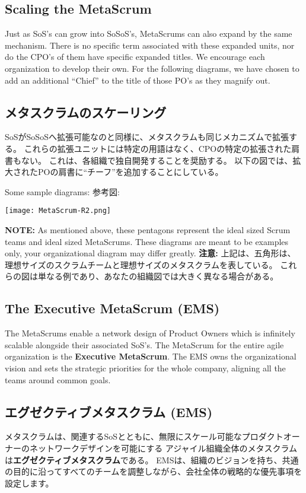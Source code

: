 \documentclass[12pt,a4paper,parskip=full]{scrartcl}
\begin{document}
\subsection{Scaling the MetaScrum}
Just as SoS's can grow into SoSoS's, MetaScrums can also expand by the same
mechanism. There is no specific term associated with these expanded units,
nor do the CPO's of them have specific expanded titles. We encourage each
organization to develop their own. For the following diagrams, we have
chosen to add an additional ``Chief'' to the title of those PO's as they
magnify out.
\fi
\subsection{メタスクラムのスケーリング}
SoSがSoSoSへ拡張可能なのと同様に、メタスクラムも同じメカニズムで拡張する。
これらの拡張ユニットには特定の用語はなく、CPOの特定の拡張された肩書もない。
これは、各組織で独自開発することを奨励する。
以下の図では、拡大されたPOの肩書に``チーフ''を追加することにしている。

{}
Some sample diagrams:
\fi
参考図:

\texttt{[image: MetaScrum-R2.png]}

\textbf{NOTE:} As mentioned above, these pentagons represent the ideal
sized Scrum teams and ideal sized MetaScrums. These diagrams are meant to
be examples only, your organizational diagram may differ greatly.
\fi
\textbf{注意:} 上記は、五角形は、理想サイズのスクラムチームと理想サイズのメタスクラムを表している。
これらの図は単なる例であり、あなたの組織図では大きく異なる場合がある。

\subsection{The Executive MetaScrum (EMS)}
The MetaScrums enable a network design of Product Owners which is
infinitely scalable alongside their associated SoS's. The MetaScrum for the
entire agile organization is the \textbf{Executive MetaScrum}. The EMS owns
the organizational vision and sets the strategic priorities for the whole
company, aligning all the teams around common goals.
\fi
\subsection{エグゼクティブメタスクラム (EMS)}
メタスクラムは、関連するSoSとともに、無限にスケール可能なプロダクトオーナーのネットワークデザインを可能にする
アジャイル組織全体のメタスクラムは\textbf{エグゼクティブメタスクラム}である。
EMSは、組織のビジョンを持ち、共通の目的に沿ってすべてのチームを調整しながら、会社全体の戦略的な優先事項を設定します。
\end{document}
